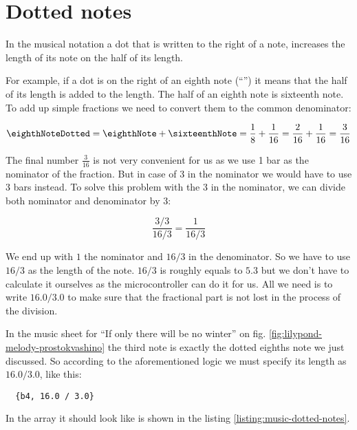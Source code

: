 \documentclass[../sparc.tex]{subfiles}
\begin{document}
\section{Dotted notes}

In the musical notation a dot that is written to the right of a note, increases
the length of its note on the half of its length.

For example, if a dot is on the right of an eighth note (``\eighthNoteDotted'')
it means that the half of its length is added to the length.  The half of an
eighth note is sixteenth note.  To add up simple fractions we need to convert
them to the common denominator:

\begin{equation}
  \mbox{\eighthNoteDotted} = \mbox{\eighthNote} + \mbox{\sixteenthNote}
  = \frac{1}{8} + \frac{1}{16} = \frac{2}{16} + \frac{1}{16} = \frac{3}{16}
\end{equation}

The final number $\frac{3}{16}$ is not very convenient for us as we use 1 bar as
the nominator of the fraction.  But in case of 3 in the nominator we would have
to use 3 bars instead.  To solve this problem with the 3 in the nominator, we
can divide both nominator and denominator by 3:

\begin{equation}
  \frac{3 / 3}{16 / 3} = \frac{1}{16 / 3}
\end{equation}

We end up with $1$ the nominator and $16 / 3$ in the denominator.  So we have to
use $16 / 3$ as the length of the note.  $16 / 3$ is roughly equals to $5.3$ but
we don't have to calculate it ourselves as the microcontroller can do it for us.
All we need is to write $16.0 / 3.0$ to make sure that the fractional part is
not lost in the process of the division.

In the music sheet for ``If only there will be no winter'' on
fig. \ref{fig:lilypond-melody-prostokvashino} the third note is exactly the
dotted eighths note we just discussed.  So according to the aforementioned logic
we must specify its length as $16.0 / 3.0$, like this:

\begin{verbatim}
  {b4, 16.0 / 3.0}
\end{verbatim}

In the array it should look like is shown in the listing
\ref{listing:music-dotted-notes}.
\end{document}
